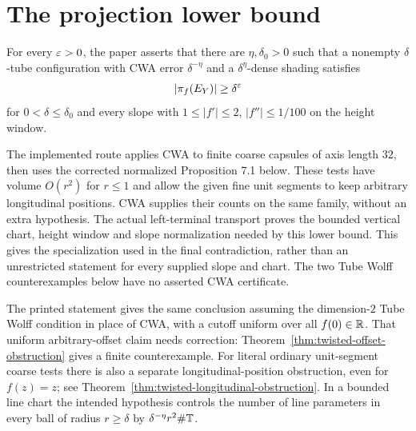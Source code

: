 \section{The projection lower bound}

\begin{proposition}
\label{prop:twisted-cwa}
For every $\varepsilon>0$, the paper asserts that there are
$\eta,\delta_0>0$ such that a nonempty $\delta$-tube configuration
with CWA error $\delta^{-\eta}$ and a $\delta^\eta$-dense shading
satisfies
\[
                         |\pi_f(E_Y)|\geq\delta^\varepsilon
\]
for $0<\delta\leq\delta_0$ and every slope with
$1\leq|f'|\leq2$, $|f''|\leq1/100$ on the height window.
\end{proposition}
\begin{remark}
\label{rem:twisted-cwa-scope}
The implemented route applies CWA to finite coarse capsules of axis
length $32$, then uses the corrected normalized Proposition 7.1 below.
These tests have volume $O(r^2)$ for $r\leq1$ and allow the given fine
unit segments to keep arbitrary longitudinal positions. CWA supplies
their counts on the same family, without an extra hypothesis.
The actual left-terminal transport proves the bounded vertical chart,
height window and slope normalization needed by this lower bound.
This gives the specialization used in the final contradiction, rather
than an unrestricted statement for every supplied slope and chart.
The two Tube Wolff counterexamples below have no asserted CWA certificate.
\end{remark}

\begin{proposition}
\label{prop:twisted-tube-wolff}
The printed statement gives the same conclusion assuming the dimension-$2$
Tube Wolff condition in place of CWA, with a cutoff uniform over all
$f(0)\in\mathbb{R}$. That uniform arbitrary-offset claim needs correction:
Theorem~\ref{thm:twisted-offset-obstruction} gives a finite counterexample.
For literal ordinary unit-segment coarse tests there is also a separate
longitudinal-position obstruction, even for $f(z)=z$;
see Theorem~\ref{thm:twisted-longitudinal-obstruction}.
In a bounded line chart the
intended hypothesis controls the number of line parameters in every
ball of radius $r\geq\delta$ by
$\delta^{-\eta}r^2\#\mathbb{T}$.
\end{proposition}

